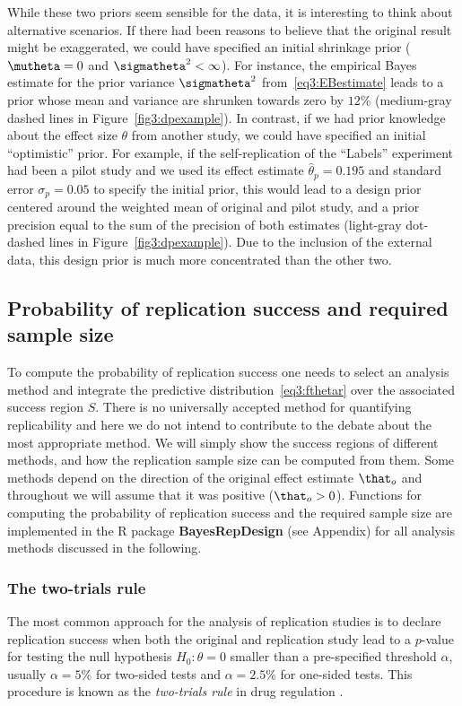 While these two priors seem sensible for the \citet{Protzko2020} data, it is
interesting to think about alternative scenarios. If there had been reasons to
believe that the original result might be exaggerated, we could have specified
an initial shrinkage prior ($\mutheta = 0$ and $\sigmatheta^{2} < \infty$). For
instance, the empirical Bayes estimate for the prior variance $\sigmatheta^{2}$
from~\eqref{eq3:EBestimate} leads to a prior whose mean and variance are shrunken
towards zero by $12$\% (medium-gray
dashed lines in Figure~\ref{fig3:dpexample}). In contrast, if we had prior
knowledge about the effect size $\theta$ from another study, we could have
specified an initial ``optimistic'' prior. For example, if the self-replication
of the ``Labels'' experiment had been a pilot study and we used its
effect estimate $\hat{\theta}_{p} = 0.195$ and
standard error $\sigma_{p} = 0.05$ to specify
the initial prior, this would lead to a design prior centered around the
weighted mean of original and pilot study, and a prior precision equal to the
sum of the precision of both estimates (light-gray dot-dashed lines in
Figure~\ref{fig3:dpexample}). Due to the inclusion of the external data, this
design prior is much more concentrated than the other two.


\subsection{Probability of replication success and required sample size}
To compute the probability of replication success one needs to select an
analysis method and integrate the predictive distribution~\eqref{eq3:fthetar}
over the associated success region $S$. There is no universally accepted method
for quantifying replicability and here we do not intend to contribute to the
debate about the most appropriate method. We will simply show the success
regions of different methods, and how the replication sample size can be
computed from them. Some methods depend on the direction of the original effect
estimate $\that_{o}$ and throughout we will assume that it was positive
($\that_{o} > 0$). Functions for computing the probability of replication
success and the required sample size are implemented in the R package
\textbf{BayesRepDesign} (see Appendix) %
for all analysis methods discussed in the following.


\subsubsection{The two-trials rule}
The most common approach for the analysis of replication studies is to declare
replication success when both the original and replication study lead to a
$p$-value for testing the null hypothesis $H_{0} \colon \theta = 0$ smaller than
a pre-specified threshold $\alpha$, usually $\alpha = 5\%$ for two-sided tests
and $\alpha = 2.5\%$ for one-sided tests. This procedure is known as the
\emph{two-trials rule} in drug regulation \citep{Senn2008}.

